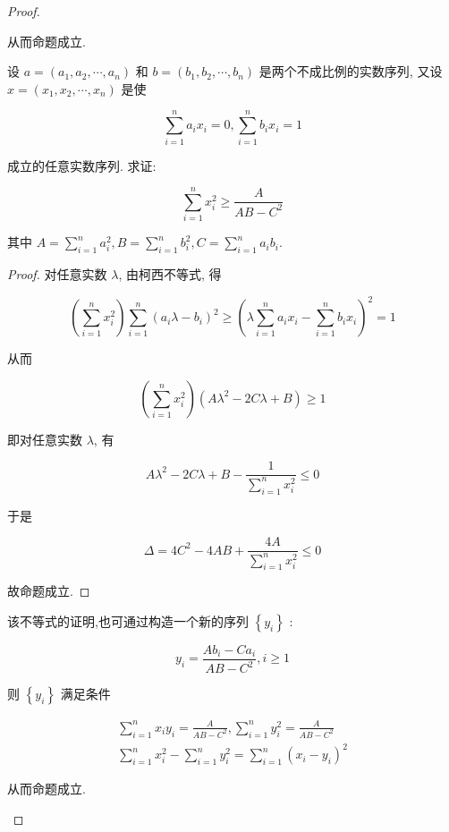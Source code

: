 \begin{proof}
\begin{example}
\begin{solution}
\begin{note}
\begin{solution}
\begin{note}
	从而命题成立.
\end{note}

\begin{example}
	设 $a=\left(a_{1}, a_{2}, \cdots, a_{n}\right)$ 和 $b=\left(b_{1}, b_{2}, \cdots, b_{n}\right)$ 是两个不成比例的实数序列, 又设 $x=\left(x_{1}, x_{2}, \cdots, x_{n}\right)$ 是使
	
	$$
	\sum_{i=1}^{n} a_{i} x_{i}=0, \sum_{i=1}^{n} b_{i} x_{i}=1
	$$
	
	成立的任意实数序列. 求证:
	
	$$
	\sum_{i=1}^{n} x_{i}^{2} \geqslant \frac{A}{A B-C^{2}}
	$$
	
	其中 $A=\sum_{i=1}^{n} a_{i}^{2}, B=\sum_{i=1}^{n} b_{i}^{2}, C=\sum_{i=1}^{n} a_{i} b_{i}$.
\end{example}
\begin{proof}
	对任意实数 $\lambda$, 由柯西不等式, 得
	
	$$
	\left(\sum_{i=1}^{n} x_{i}^{2}\right) \sum_{i=1}^{n}\left(a_{i} \lambda-b_{i}\right)^{2} \geqslant\left(\lambda \sum_{i=1}^{n} a_{i} x_{i}-\sum_{i=1}^{n} b_{i} x_{i}\right)^{2}=1
	$$
	
	从而
	
	$$
	\left(\sum_{i=1}^{n} x_{i}^{2}\right)\left(A \lambda^{2}-2 C \lambda+B\right) \geqslant 1
	$$
	
	即对任意实数 $\lambda$, 有
	
	$$
	A \lambda^{2}-2 C \lambda+B-\frac{1}{\sum_{i=1}^{n} x_{i}^{2}} \leqslant 0
	$$
	
	于是
	
	$$
	\Delta=4 C^{2}-4 A B+\frac{4 A}{\sum_{i=1}^{n} x_{i}^{2}} \leqslant 0
	$$
	
	故命题成立.
\end{proof}
\begin{note}
	该不等式的证明,也可通过构造一个新的序列 $\left\{y_{i}\right\}$ :
	
	$$
	y_{i}=\frac{A b_{i}-C a_{i}}{A B-C^{2}}, i \geqslant 1
	$$
	
	则 $\left\{y_{i}\right\}$ 满足条件
	
	$$
	\begin{gathered}
	\sum_{i=1}^{n} x_{i} y_{i}=\frac{A}{A B-C^{2}}, \sum_{i=1}^{n} y_{i}^{2}=\frac{A}{A B-C^{2}} \\
	\sum_{i=1}^{n} x_{i}^{2}-\sum_{i=1}^{n} y_{i}^{2}=\sum_{i=1}^{n}\left(x_{i}-y_{i}\right)^{2}
	\end{gathered}
	$$
	
	从而命题成立.
\end{note}


\end{solution}
\end{note}
\end{solution}
\end{example}
\end{proof}
